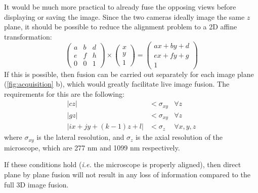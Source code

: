 It would be much more practical to already fuse the opposing views before displaying or saving the image. Since the two cameras ideally image the same $z$ plane, it should be possible to reduce the alignment problem to a 2D affine transformation:
\[
\begin{pmatrix}
a & b & d\\ 
e & f & h \\
0 & 0 & 1
\end{pmatrix}
\times
\begin{pmatrix}
x\\
y\\
1
\end{pmatrix}
=
\begin{pmatrix}
a x + b y + d\\ 
e x + f y + g\\
1
\end{pmatrix}
\]
If this is possible, then fusion can be carried out separately for each image plane (\autoref{fig:acquisition} b), which would greatly facilitate live image fusion. The requirements for this are the following:
\begin{align}
\left| c z \right| &< \sigma_{xy} & \forall z \label{eq:req1}\\
\left| g z \right|  &< \sigma_{xy} & \forall z \label{eq:req2}\\
\left| i x + j y + (k-1)  z + l \right| &< \sigma_z & \forall x, y, z  \label{eq:req3}
\end{align}
where $\sigma_{xy}$ is the lateral resolution, and $\sigma_z$ is the axial resolution of the microscope, which are 277 nm and 1099 nm respectively. 

 If these conditions hold (\textit{i.e.} the microscope is properly aligned), then direct plane by plane fusion will not result in any loss of information compared to the full 3D image fusion.



